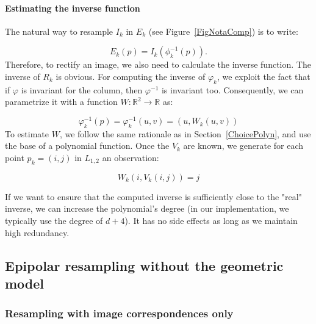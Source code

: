 \documentclass{ipol}
\newcommand{\RR}{\ensuremath{\mathbb{R}}}
\begin{document}
\paragraph{Estimating the inverse function}

The natural way to resample  $I_k$ in $E_k$ (see Figure~\ref{FigNotaComp}) is to write:

\begin{equation}
  E_k(p) = I_k(\phi^{-1}_k(p)).
\end{equation}
Therefore, to rectify an image, we also need to calculate the inverse function. The inverse of $R_k$ is obvious. For computing the inverse of $\varphi_k$,  we
exploit the fact that if $\varphi$ is invariant for the column, then $\varphi^{-1}$ is invariant too. Consequently, we can parametrize it with a function $W: \RR^2 \rightarrow \RR$ as:

\begin{equation}
  \varphi^{-1}_k(p) = \varphi^{-1}_k(u,v) = (u,W_k(u,v))  
\end{equation}
%
To estimate  $W$, we follow the same rationale as in Section~\ref{ChoicePolyn}, and
use the base of a polynomial function. Once the $V_k$ are known, we generate
for each point $p_k=(i,j)$ in $L_{1,2}$ an observation:

\begin{equation}
   W_k(i,V_k(i,j))  = j \label{InverseEpip}
\end{equation}

If we want to ensure that the computed inverse is sufficiently close
to the "real" inverse, we can increase the polynomial's degree (in our implementation, we typically use the degree of $d+4$). It has no side effects as long as we maintain high redundancy.



\subsection{Epipolar resampling without the geometric model}
\label{SecEpipNoModel}

\subsubsection{Resampling with image correspondences only}

\label{EpipTieP}
\end{document}
